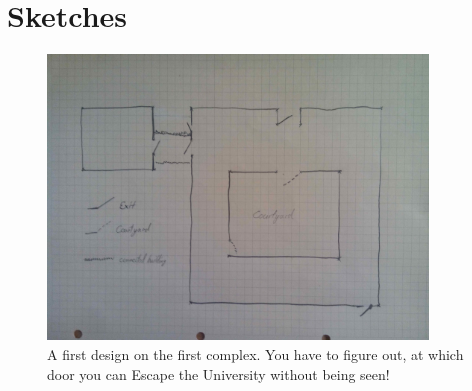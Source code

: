 \documentclass[12pt]{article}
\begin{document}
\section*{Sketches}
\begin{figure}[H]
	\center
		\includegraphics[width=0.9\textwidth]{Images/mapoverview}
		\caption{A first design on the first complex. You have to figure out, at which door you can Escape the University without being seen!}
\end{figure}
\end{document}
